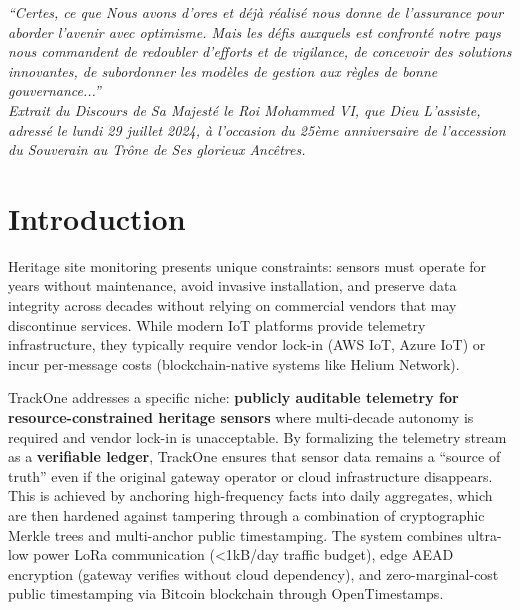 \clearpage
\thispagestyle{empty}
\vspace*{\fill}
\begin{center}
  \begin{minipage}{0.8\textwidth}
  \itshape
  ``Certes, ce que Nous avons d'ores et déjà réalisé nous donne de l'assurance pour aborder l'avenir avec optimisme.
  Mais les défis auxquels est confronté notre pays nous commandent de redoubler d'efforts et de vigilance, de concevoir des solutions innovantes, de subordonner les modèles de gestion aux règles de bonne gouvernance...''\\
  \hfill Extrait du Discours de Sa Majesté le Roi Mohammed VI, que Dieu L'assiste, adressé le lundi 29 juillet 2024, à l'occasion du 25ème anniversaire de l'accession du Souverain au Trône de Ses glorieux Ancêtres.
  \end{minipage}
\end{center}
\vspace*{\fill}
\clearpage
\section{Introduction}\label{sec:introduction}

Heritage site monitoring presents unique constraints: sensors must operate for years without maintenance, avoid invasive installation, and preserve data integrity across decades without relying on commercial vendors that may discontinue services.
While modern \ac{IoT} platforms provide telemetry infrastructure, they typically require vendor lock-in (AWS \ac{IoT}, Azure \ac{IoT}) or incur per-message costs (blockchain-native systems like Helium Network).

TrackOne addresses a specific niche: \textbf{publicly auditable telemetry for resource-constrained heritage sensors} where multi-decade autonomy is required and vendor lock-in is unacceptable.
By formalizing the telemetry stream as a \textbf{verifiable ledger}, TrackOne ensures that sensor data remains a ``source of truth'' even if the original gateway operator or cloud infrastructure disappears.
This is achieved by anchoring high-frequency facts into daily aggregates, which are then hardened against tampering through a combination of cryptographic Merkle trees and multi-anchor public timestamping.
The system combines ultra-low power \ac{LoRa} communication (<1kB/day traffic budget), edge \ac{AEAD} encryption (gateway verifies without cloud dependency), and zero-marginal-cost public timestamping via Bitcoin blockchain through OpenTimestamps.

